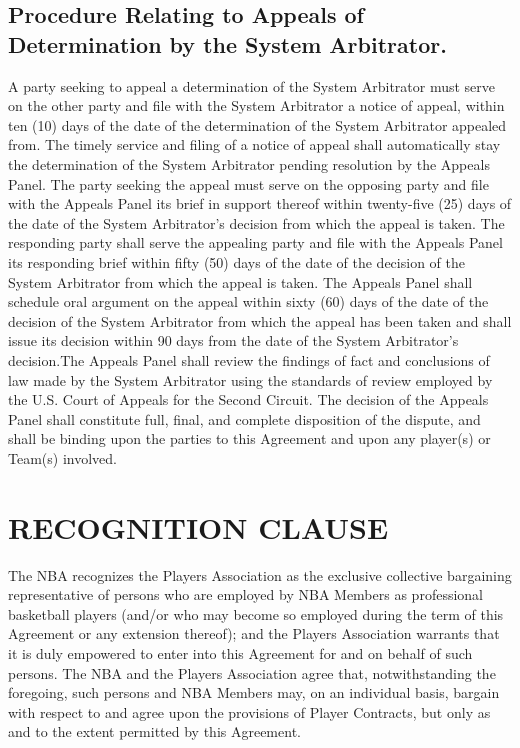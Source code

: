 \documentclass[
]{book}
\begin{document}
\hypertarget{procedure-relating-to-appeals-of-determination-by-the-system-arbitrator.}{%
\section{Procedure Relating to Appeals of Determination by the System Arbitrator.}\label{procedure-relating-to-appeals-of-determination-by-the-system-arbitrator.}}

A party seeking to appeal a determination of the System Arbitrator must serve on the other party and file with the System Arbitrator a notice of appeal, within ten (10) days of the date of the determination of the System Arbitrator appealed from. The timely service and filing of a notice of appeal shall automatically stay the determination of the System Arbitrator pending resolution by the Appeals Panel. The party seeking the appeal must serve on the opposing party and file with the Appeals Panel its brief in support thereof within twenty-five (25) days of the date of the System Arbitrator's decision from which the appeal is taken. The responding party shall serve the appealing party and file with the Appeals Panel its responding brief within fifty (50) days of the date of the decision of the System Arbitrator from which the appeal is taken. The Appeals Panel shall schedule oral argument on the appeal within sixty (60) days of the date of the decision of the System Arbitrator from which the appeal has been taken and shall issue its decision within 90 days from the date of the System Arbitrator's decision.The Appeals Panel shall review the findings of fact and conclusions of law made by the System Arbitrator using the standards of review employed by the U.S. Court of Appeals for the Second Circuit. The decision of the Appeals Panel shall constitute full, final, and complete disposition of the dispute, and shall be binding upon the parties to this Agreement and upon any player(s) or Team(s) involved.

\hypertarget{recognition-clause}{%
\chapter{RECOGNITION CLAUSE}\label{recognition-clause}}

The NBA recognizes the Players Association as the exclusive collective bargaining representative of persons who are employed by NBA Members as professional basketball players (and/or who may become so employed during the term of this Agreement or any extension thereof); and the Players Association warrants that it is duly empowered to enter into this Agreement for and on behalf of such persons. The NBA and the Players Association agree that, notwithstanding the foregoing, such persons and NBA Members may, on an individual basis, bargain with respect to and agree upon the provisions of Player Contracts, but only as and to the extent permitted by this Agreement.
\end{document}
